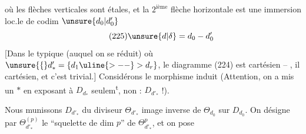 où les flèches verticales sont étales,
et la $2^{\mathrm{ième}}$ flèche horizontale est une
immersion loc.le de codim $\unsure{d_0|d^{\prime}_0}$
\[
\tag{225}\unsure{d|\delta}=d_0-d'_0
\]
[Dans le typique (auquel on se réduit)
où $\unsure{\{}d'_* = \{d_1\uline{>--} >d_r\}$, le diagramme
(224) est cartésien -- , il
  cartésien,  et c'est trivial.]
Considérons le morphisme induit
(Attention, on a mis un $*$ en exposant
à $D_{d_*}$ seulem\textsuperscript{t}, non : $D_{d'_*}$ !).

Nous munissons $D_{d'_*}$ du diviseur
$\Theta_{d'_*}$ image inverse de $\Theta_{d_0}$ sur $D_{d_0}$.
On désigne par $\Theta_{d'_*}^{(p)}$ le ``squelette
de dim $p$'' de $\Theta_{d'_*}^{p}$, et  on pose
